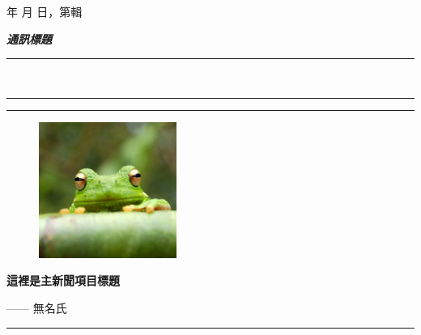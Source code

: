 \documentclass[10pt,a4paper]{article}
\newcommand{\zhtoday}{%
 \kansuji\year 年
 \kansuji\month 月
 \kansuji\day 日}
\newcommand{\HorRule}[1]{\noindent\rule{\linewidth}{#1}} %
\newcommand{\SepRule}{\noindent	%
\begin{center}
\rule{250pt}{1pt} %
\end{center}
}
\newcommand{\NewsletterName}[1]{ %
\begin{center}
\textit{\Huge \textbf{#1}}
\end{center}
\par \normalsize \normalfont}
\newcommand{\JournalIssue}[1]{ %
\hfill \textsc{\zhtoday，第\kansuji #1輯} %
\par \normalsize \normalfont}
\newcommand{\NewsItem}[1]{ %
\vspace{24pt}\bf \large #1\vspace{3pt} %
\par \normalsize \normalfont}
\begin{document}
\JournalIssue{4} %

\NewsletterName{通訊標題} %

\noindent\HorRule{3pt} \\[-0.75\baselineskip] %
\HorRule{1pt} %


\vspace{0.5cm}
\SepRule
\vspace{-0.5cm}

\begin{center}
\begin{minipage}[h]{0.75\linewidth}
\begin{figure}
\includegraphics[width=0.40\textwidth]{frog.jpg}
\\
\end{figure}

\NewsItem{這裡是主新聞項目標題} %
\vspace{3pt} %
\textit{\zhlipsum[1][name=trad]}

\par\hfill —— 無名氏
\end{minipage}
\end{center}

\vspace{0.5cm}
\SepRule %
\vspace{0.5cm}
\end{document}
